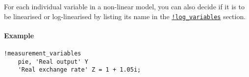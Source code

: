 For each individual variable in a non-linear model, you can also decide
if it is to be linearised or log-linearised by listing its name in the
\href{modellang/logvariables}{\texttt{!log\_variables}} section.

\paragraph{Example}\label{example}

\begin{verbatim}
!measurement_variables
    pie, 'Real output' Y
    'Real exchange rate' Z = 1 + 1.05i;
\end{verbatim}


